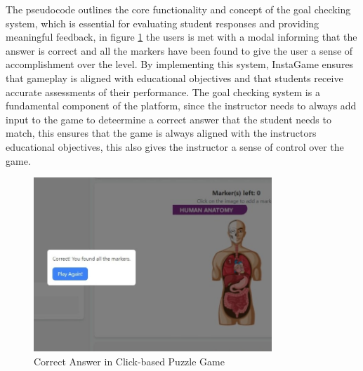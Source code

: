 The pseudocode outlines the core functionality and concept of the goal checking system, which is essential for evaluating student responses and providing meaningful feedback, in figure \ref{fig:correctAnswer} the users is met with a modal informing that the answer is correct and all the markers have been found to give the user a sense of accomplishment over the level. By implementing this system, InstaGame ensures that gameplay is aligned with educational objectives and that students receive accurate assessments of their performance. The goal checking system is a fundamental component of the platform, since the instructor needs to always add input to the game to deteermine a correct answer that the student needs to match, this ensures that the game is always aligned with the instructors educational objectives, this also gives the instructor a sense of control over the game.

\begin{figure}
	\centering
	\includegraphics[width=0.8\textwidth]{figures/Diagnose_Game/Diagnose_Game_Correct.jpeg}
	\caption{Correct Answer in Click-based Puzzle Game}
	\label{fig:correctAnswer}
\end{figure}